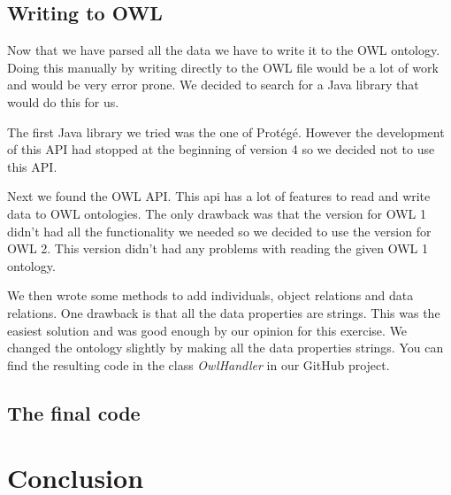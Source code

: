 \documentclass{article}
\begin{document}
\subsection{Writing to OWL}
\label{sec:writ_owl}
Now that we have parsed all the data we have to write it to the OWL ontology. Doing this manually by writing directly to the OWL file would be a lot of work and would be very error prone. We decided to search for a Java library that would do this for us.\par
The first Java library we tried was the one of Prot\'eg\'e. However the development of this API had stopped at the beginning of version 4 so we decided not to use this API.\par
Next we found the OWL API\cite{owlapi}. This api has a lot of features to read and write data to OWL ontologies. The only drawback was that the version for OWL 1 didn't had all the functionality we needed so we decided to use the version for OWL 2. This version didn't had any problems with reading the given OWL 1 ontology.\par
We then wrote some methods to add individuals, object relations and data relations. One drawback is that all the data properties are strings. This was the easiest solution and was good enough by our opinion for this exercise. We changed the ontology slightly by making all the data properties strings. You can find the resulting code in the class \textit{OwlHandler} in our GitHub project\cite{githubproject}.
\subsection{The final code}
\section{Conclusion}
\printbibliography
\end{document}
